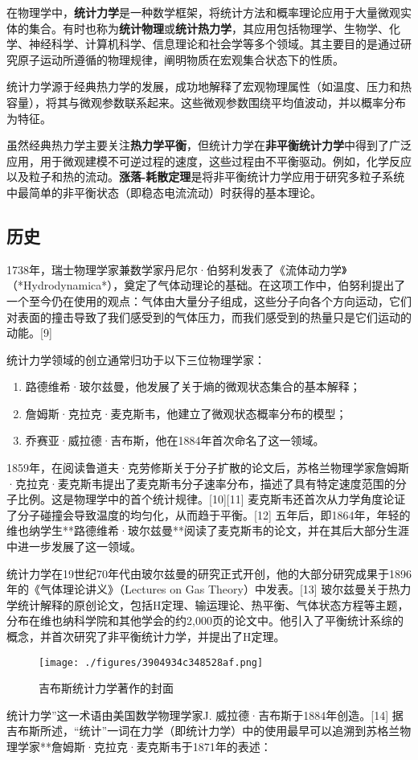 

在物理学中，\textbf{统计力学}是一种数学框架，将统计方法和概率理论应用于大量微观实体的集合。有时也称为\textbf{统计物理}或\textbf{统计热力学}，其应用包括物理学、生物学、化学、神经科学、计算机科学、信息理论和社会学等多个领域。其主要目的是通过研究原子运动所遵循的物理规律，阐明物质在宏观集合状态下的性质。

统计力学源于经典热力学的发展，成功地解释了宏观物理属性（如温度、压力和热容量），将其与微观参数联系起来。这些微观参数围绕平均值波动，并以概率分布为特征。

虽然经典热力学主要关注\textbf{热力学平衡}，但统计力学在\textbf{非平衡统计力学}中得到了广泛应用，用于微观建模不可逆过程的速度，这些过程由不平衡驱动。例如，化学反应以及粒子和热的流动。\textbf{涨落-耗散定理}是将非平衡统计力学应用于研究多粒子系统中最简单的非平衡状态（即稳态电流流动）时获得的基本理论。
\subsection{历史}
1738年，瑞士物理学家兼数学家丹尼尔·伯努利发表了《流体动力学》（*Hydrodynamica*），奠定了气体动理论的基础。在这项工作中，伯努利提出了一个至今仍在使用的观点：气体由大量分子组成，这些分子向各个方向运动，它们对表面的撞击导致了我们感受到的气体压力，而我们感受到的热量只是它们运动的动能。[9]

统计力学领域的创立通常归功于以下三位物理学家：
\begin{enumerate}
\item 路德维希·玻尔兹曼，他发展了关于熵的微观状态集合的基本解释；
\item 詹姆斯·克拉克·麦克斯韦，他建立了微观状态概率分布的模型；
\item 乔赛亚·威拉德·吉布斯，他在1884年首次命名了这一领域。
\end{enumerate}

1859年，在阅读鲁道夫·克劳修斯关于分子扩散的论文后，苏格兰物理学家詹姆斯·克拉克·麦克斯韦提出了麦克斯韦分子速率分布，描述了具有特定速度范围的分子比例。这是物理学中的首个统计规律。[10][11] 麦克斯韦还首次从力学角度论证了分子碰撞会导致温度的均匀化，从而趋于平衡。[12] 五年后，即1864年，年轻的维也纳学生**路德维希·玻尔兹曼**阅读了麦克斯韦的论文，并在其后大部分生涯中进一步发展了这一领域。

统计力学在19世纪70年代由玻尔兹曼的研究正式开创，他的大部分研究成果于1896年的《气体理论讲义》（Lectures on Gas Theory）中发表。[13] 玻尔兹曼关于热力学统计解释的原创论文，包括H定理、输运理论、热平衡、气体状态方程等主题，分布在维也纳科学院和其他学会的约2,000页的论文中。他引入了平衡统计系综的概念，并首次研究了非平衡统计力学，并提出了H定理。
\begin{figure}[ht]
\centering
\texttt{[image: ./figures/3904934c348528af.png]}
\caption{吉布斯统计力学著作的封面} \label{fig_TJLX_1}
\end{figure}
统计力学”这一术语由美国数学物理学家J. 威拉德·吉布斯于1884年创造。[14] 据吉布斯所述，“统计”一词在力学（即统计力学）中的使用最早可以追溯到苏格兰物理学家**詹姆斯·克拉克·麦克斯韦于1871年的表述：


